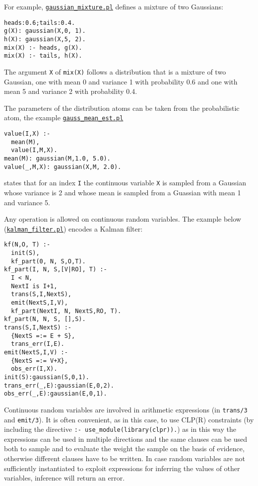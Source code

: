 For example, \href{http://cplint.eu/example/inference/gaussian_mixture.pl}{\texttt{gaussian\_mixture.pl}} defines a mixture of two Gaussians:
\begin{verbatim}
heads:0.6;tails:0.4.
g(X): gaussian(X,0, 1).
h(X): gaussian(X,5, 2).
mix(X) :- heads, g(X).
mix(X) :- tails, h(X).
\end{verbatim}
The argument \verb|X| of
\verb|mix(X)| follows a distribution that is a mixture of two Gaussian,
one with mean 0 and variance 1 with probability 0.6 and one with 
mean 5 and variance 2 with probability 0.4.

The parameters of the distribution atoms can be taken from the probabilistic
atom, the example \href{http://cplint.eu/example/inference/gauss_mean_est.pl}{\texttt{gauss\_mean\_est.pl}}
\begin{verbatim}
value(I,X) :-
  mean(M),
  value(I,M,X).
mean(M): gaussian(M,1.0, 5.0).
value(_,M,X): gaussian(X,M, 2.0).
\end{verbatim}
states that for an index \verb|I| the continuous variable \verb|X| is 
sampled from a Gaussian whose variance is 2 and whose mean is sampled from a Guassian with mean 1 and
variance 5.

Any operation is allowed on continuous random variables. The example below
(\href{http://cplint.eu/example/inference/kalman_filter.pl}{\texttt{kalman\_filter.pl}}) encodes a Kalman filter:
\begin{verbatim}
kf(N,O, T) :-
  init(S),
  kf_part(0, N, S,O,T).
kf_part(I, N, S,[V|RO], T) :-
  I < N,
  NextI is I+1,
  trans(S,I,NextS),
  emit(NextS,I,V),
  kf_part(NextI, N, NextS,RO, T).
kf_part(N, N, S, [],S).
trans(S,I,NextS) :-
  {NextS =:= E + S},
  trans_err(I,E).
emit(NextS,I,V) :-
  {NextS =:= V+X},
  obs_err(I,X).
init(S):gaussian(S,0,1).
trans_err(_,E):gaussian(E,0,2).
obs_err(_,E):gaussian(E,0,1).
\end{verbatim}
Continuous random variables are involved
in arithmetic expressions (in \verb|trans/3| and \verb|emit/3|). It
is often convenient, as in this case, to use CLP(R) constraints (by
including the directive \verb|:- use_module(library(clpr)).|) as 
in this way the expressions can be used in multiple directions and 
the same clauses can be used both to sample and to evaluate the weight the sample on the basis
of evidence,
otherwise different clauses have to be written.
In case random variables are not sufficiently instantiated to 
exploit expressions for inferring the values of other variables, 
inference will return an error.

